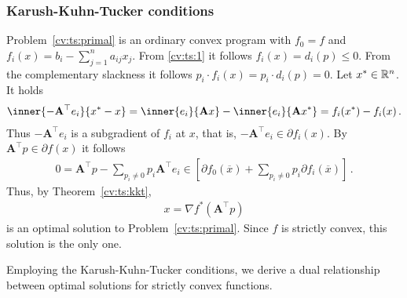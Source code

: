 \subsubsection*{Karush-Kuhn-Tucker conditions}
Problem~\ref{cv:ts:primal} is an ordinary convex program with
$
f_0=f
$
and
$
f_i(x)
=
 b_i
 -
\sum_{j=1}^{n} 
a_{ij}x_j
$.
From \eqref{cv:ts:1}
it follows
$
f_i(x)=d_i(p)\le 0
$.
From the complementary slackness it follows
$
p_i\cdot f_i(x)=p_i \cdot d_i(p)= 0
$.
Let $x^* \in \mathbb{R}^n$.
It holds
\begin{align}
  \inner
  {
    - \mathbf{A}^\top
    e_i
  }
  {
    x^*-x
  }
  =
  \inner{e_i}
  {
    \mathbf{A}
    x
  }
  -
  \inner{e_i}
  {
    \mathbf{A}
    x^*
  }
  =
  f_i(x^*)
  -
  f_i(x)
  \,.
\end{align}
Thus 
$
    - \mathbf{A}^\top
    e_i
$
is a subgradient of $f_i$ at $x$, that is,
$
    - \mathbf{A}^\top
    e_i
    \in
    \partial
    f_i(x)
$.
By 
$
    \mathbf{A}^\top p
    \in
    \partial
    f(x)
$
it follows
\begin{gather}
  0
  =
    \mathbf{A}^\top p
    -
    \sum_{p_i\neq 0} 
    p_i 
     \mathbf{A}^\top
     e_i
     \in
         [
          \partial
        f_0(
   \overline{x}
        )
        +
        \sum_{p_i\neq 0}
        p_i 
        \partial
        f_i(
   \overline{x}
        )
         ]
         \,.
\end{gather}
Thus, by Theorem~\ref{cv:ts:kkt}, 
\begin{gather}
x=
  \nabla
  f^*
  (
    \mathbf{A}^\top
    p
  )
\end{gather}
is an optimal solution to Problem~\ref{cv:ts:primal}. 
Since
$f$ is strictly convex, this solution is the only one.
\begin{takeaways}
  Employing the Karush-Kuhn-Tucker conditions, we
  derive a dual relationship between optimal solutions
  for strictly convex functions.
\end{takeaways}
